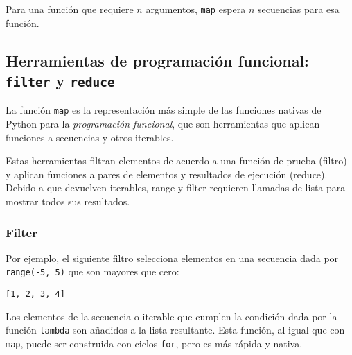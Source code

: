 Para una función que requiere \(n\) argumentos, \texttt{map} espera
\(n\) secuencias para esa función.

\subsection{\texorpdfstring{Herramientas de programación funcional:
\texttt{filter} y
\texttt{reduce}}{Herramientas de programación funcional: filter y reduce}}\label{herramientas-de-programaciuxf3n-funcional-filter-y-reduce}

La función \texttt{map} es la representación más simple de las funciones
nativas de Python para la \emph{programación funcional}, que son
herramientas que aplican funciones a secuencias y otros iterables.

Estas herramientas filtran elementos de acuerdo a una función de prueba
(filtro) y aplican funciones a pares de elementos y resultados de
ejecución (reduce). Debido a que devuelven iterables, range y filter
requieren llamadas de lista para mostrar todos sus resultados.

\subsubsection{Filter}

Por ejemplo, el siguiente filtro selecciona elementos en una secuencia
dada por \texttt{range(-5,\ 5)} que son mayores que cero:

\begin{Shaded}
\begin{Highlighting}[]
\NormalTok{(}\NormalTok{(}\OperatorTok{\textgreater{}}\NormalTok{, }\NormalTok{(}\OperatorTok{{-}}\NormalTok{, }\NormalTok{)))}
\end{Highlighting}
\end{Shaded}

\begin{verbatim}
[1, 2, 3, 4]
\end{verbatim}

Los elementos de la secuencia o iterable que cumplen la condición dada
por la función \texttt{lambda} son añadidos a la lista resultante. Esta
función, al igual que con \texttt{map}, puede ser construida con ciclos
\texttt{for}, pero es más rápida y nativa.

\begin{Shaded}
\begin{Highlighting}[]
\OperatorTok{=}\NormalTok{ []}
 \NormalTok{(}\OperatorTok{{-}}\NormalTok{, }\NormalTok{):}
    \OperatorTok{\textgreater{}}\NormalTok{:}
\end{Highlighting}
\end{Shaded}

